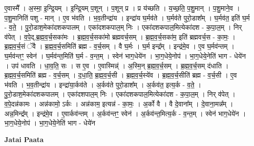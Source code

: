 \documentclass[17pt]{extarticle}
\begin{document}
ए॒वास्मै᳚ । अ॒स्मा॒ इ॒न्द्रि॒यम् । इ॒न्द्रि॒यम् प॒शून् । प॒शून् प्र । प्र य॑च्छति । य॒च्छ॒ति॒ प॒शु॒मान् । प॒शु॒माने॒व । प॒शु॒मानिति॑ पशु - मान् । ए॒व भ॑वति । भ॒व॒तीन्द्रा॑य । इन्द्रा॑य घ॒र्मव॑ते । घ॒र्मव॑ते पुरो॒डाश᳚म् । घ॒र्मव॑त॒ इति॑ घ॒र्म - व॒ते॒ । पु॒रो॒डाश॒मेका॑दशकपालम् । एका॑दशकपाल॒म् निः । एका॑दशकपाल॒मित्येका॑दश - क॒पा॒ल॒म् । निर् व॑पेत् । व॒पे॒द्,ब्र॒ह्म॒व॒र्च॒सका॑मः । ब्र॒ह्म॒व॒र्च॒सका॑मो ब्रह्मवर्च॒सम् । ब्र॒ह्म॒व॒र्च॒सका॑म॒ इति॑ ब्रह्मवर्च॒स - का॒मः॒ । ब्र॒ह्म॒व॒र्च॒सं ॅवै । ब्र॒ह्म॒व॒र्च॒समिति॑ ब्रह्म - व॒र्च॒सम् । वै घ॒र्मः । घ॒र्म इन्द्र᳚म् । इन्द्र॑मे॒व । ए॒व घ॒र्मव॑न्तम् । घ॒र्मव॑न्तꣳ॒॒ स्वेन॑ । घ॒र्मव॑न्त॒मिति॑ घ॒र्म - व॒न्त॒म् । स्वेन॑ भाग॒धेये॑न । भा॒ग॒धेये॒नोप॑ । भा॒ग॒धेये॒नेति॑ भाग - धेये॑न । उप॑ धावति । धा॒व॒ति॒ सः । स ए॒व । ए॒वास्मिन्न्॑ । अ॒स्मि॒न् ब्र॒ह्म॒व॒र्च॒सम् । ब्र॒ह्म॒व॒र्च॒सम् द॑धाति । ब्र॒ह्म॒व॒र्च॒समिति॑ ब्रह्म - व॒र्च॒सम् । द॒धा॒ति॒ ब्र॒ह्म॒व॒र्च॒सी । ब्र॒ह्म॒व॒र्च॒स्ये॑व । ब्र॒ह्म॒व॒र्च॒सीति॑ ब्रह्म - व॒र्च॒सी । ए॒व भ॑वति । भ॒व॒तीन्द्रा॑य । इन्द्रा॑या॒र्कव॑ते । अ॒र्कव॑ते पुरो॒डाश᳚म् । अ॒र्कव॑त॒ इत्य॒र्क - व॒ते॒ । पु॒रो॒डाश॒मेका॑दशकपालम् । एका॑दशपाल॒म् निः । एका॑दशकपाल॒मित्येका॑दश - क॒पा॒ल॒म् । निर् व॑पेत् । व॒पे॒दन्न॑कामः । अन्न॑कामो॒ ऽर्कः । अन्न॑काम॒ इत्यन्न॑ - का॒मः॒ । अ॒र्को वै । वै दे॒वाना᳚म् । दे॒वाना॒मन्न᳚म् । अन्न॒मिन्द्र᳚म् । इन्द्र॑मे॒व । ए॒वार्कव॑न्तम् । अ॒र्कव॑न्तꣳ॒॒ स्वेन॑ । अ॒र्कव॑न्त॒मित्य॒र्क - व॒न्त॒म् । स्वेन॑ भाग॒धेये॑न । भा॒ग॒धेये॒नोप॑ । भा॒ग॒धेये॒नेति॑ भाग - धेये॑न \newline

\textbf{Jatai Paata} \newline
\end{document}
